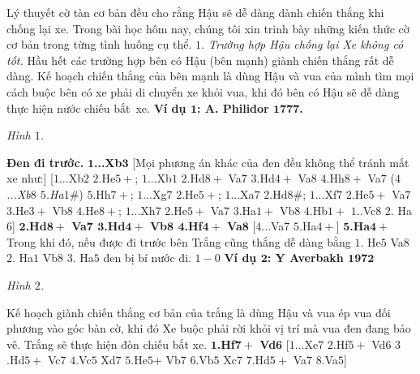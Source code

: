 \vspace*{155pt}
\begin{multicols}{2}
	Lý thuyết cờ tàn cơ bản đều cho rằng Hậu sẽ dễ dàng dành chiến thắng khi chống lại xe.
	\vskip 0.1cm
	Trong bài học hôm nay, chúng tôi xin trinh bày những kiến thức cờ cơ bản trong từng tình huống cụ thể.
	\vskip 0.1cm
	\textit{$1.$ Trường hợp Hậu chống lại Xe không có tốt.}
	\vskip 0.1cm 
	Hầu hết các trường hợp bên có Hậu (bên mạnh) giành chiến thắng rất dễ dàng. Kế hoạch chiến thắng của bên mạnh là dùng Hậu và vua của mình tìm mọi cách buộc bên có xe phải di chuyển xe khỏi vua, khi đó bên có Hậu sẽ dễ dàng thực hiện nước chiếu bắt~xe.
	\vskip 0.1cm
	\textbf{\color{gocco}Ví dụ $\pmb{1}$: A. Philidor $\pmb{1777}$.}
	\begin{center}
		\newgame
		\scalebox{0.85}\showboard
		\vskip 0.1cm
		\textit{\small\color{gocco}Hình $1$.}
		\vspace*{-5pt}
	\end{center}
	\textbf{\color{gocco}Đen đi trước.}
	\vskip 0.1cm
	$\pmb{1}$\textbf{\color{gocco}...Xb}$\pmb{3}$ [Mọi phương án khác của đen đều không thể tránh mất xe như:]
	\vskip 0.1cm
	[$1$...Xb$2$ $2$.He$5+$; $1$...Xb$1$ $2$.Hd$8+$ Va$7$ $3$.Hd$4+$ Va$8$ $4$.Hh$8+$ Va$7$ (\textit{$4$...Xb$8$ $5$.Ha$1\#$}) $5$.Hh$7+$; $1$...Xg$7$ $2$.He$5+$; $1$...Xa$7$ $2$.Hd$8\#$; $1$...Xf$7$ $2$.He$5+$ Va$7$ $3$.He$3+$ Vb$8$ $4$.He$8+$; $1$...Xh$7$ $2$.He$5+$ Va$7$ $3$.Ha$1+$ Vb$8$ $4$.Hb$1+$
	$1$..Vc$8$ $2$. Ha$6$]
	\vskip 0.1cm
	$\pmb{2}$\textbf{\color{gocco}.Hd$\pmb{8+}$ Va$\pmb{7}$ $\pmb{3}$.Hd$\pmb{4+}$ Vb$\pmb{8}$ $\pmb{4}$.Hf$\pmb{4+}$ Va}$\pmb{8}$ [$4$...Va$7$ $5$.Ha$4+$]
	\vskip 0.1cm
	$\pmb{5}$\textbf{\color{gocco}.Ha}$\pmb{4+}$
	\vskip 0.1cm
	Trong khi đó, nếu được đi trước bên Trắng cũng thắng dễ dàng bằng
	\vskip 0.1cm
	$1$. He$5$ Va$8$ $2$. Ha$1$ Vb$8$ $3$. Ha$5$ đen bị bí nước đi.
	\vskip 0.1cm
	$1-0$
	\vskip 0.1cm
	\textbf{\color{gocco}Ví dụ $\pmb{2}$: Y Averbakh $\pmb{1972}$}
	\begin{center}
		\newgame
		\scalebox{0.85}\showboard
		\vskip 0.1cm
		\textit{\small\color{gocco}Hình $2$.}
	\end{center}
	Kế hoạch giành chiến thắng cơ bản của trắng là dùng Hậu và vua ép vua đối phương vào góc bàn cờ, khi đó Xe buộc phải rời khỏi vị trí mà vua đen đang bảo vê. Trắng sẽ thực hiện đòn chiếu bắt xe.
	\vskip 0.1cm
	$\pmb{1}$\textbf{\color{gocco}.Hf$\pmb{7+}$ Vd}$\pmb{6}$ [$1$...Xe$7$ $2$.Hf$5+$ Vd$6$ $3$.Hd$5+$ Vc$7$ $4$.Vc$5$ Xd$7$ $5$.He$5$+ Vb$7$ $6$.Vb$5$ Xc$7$ $7$.Hd$5+$ Va$7$ $8$.Va$5$]

\end{multicols}
